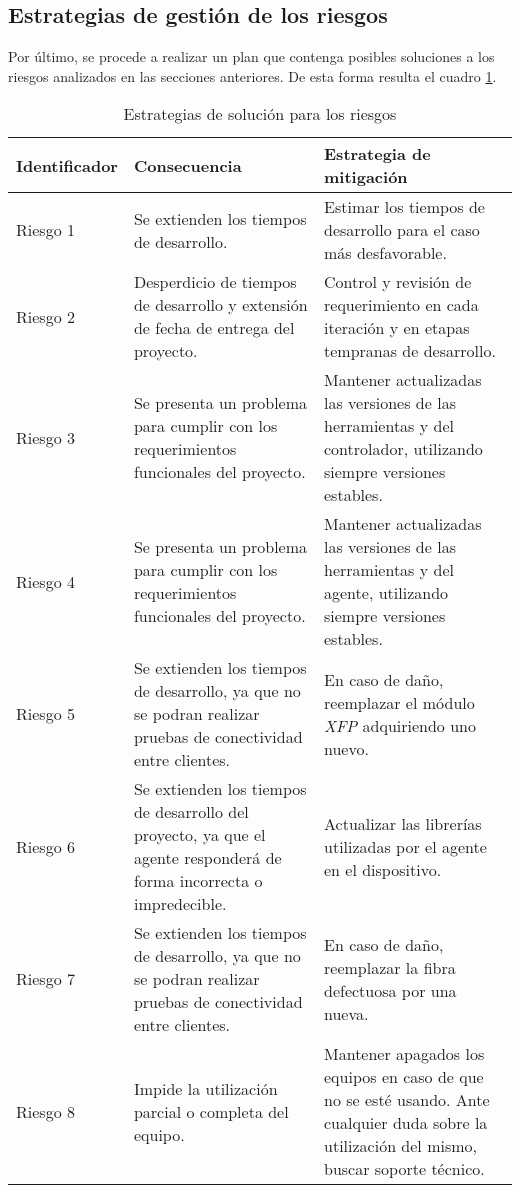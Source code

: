 \subsection{Estrategias de gestión de los riesgos}

Por último, se procede a realizar un plan que contenga posibles soluciones a los riesgos analizados en las secciones anteriores. De esta forma resulta el cuadro \ref{tab:riesgos_solucion}.

\begin{table}[H]
  \centering
  \begin{tabular}{ |m{2.2cm}|m{5.5cm}|m{5.5cm}|  }

\hline
\centering
\textbf{Identificador} & \textbf{Consecuencia} & \textbf{Estrategia de mitigación} \\
\hline
\centering
Riesgo 1 & Se extienden los tiempos de desarrollo. & Estimar los tiempos de desarrollo para el caso más desfavorable.  \\
\hline
\centering
Riesgo 2 & Desperdicio de tiempos de desarrollo y extensión de fecha de entrega del proyecto. & Control y revisión de requerimiento en cada iteración y en etapas tempranas de desarrollo.  \\
\hline
\centering
Riesgo 3 & Se presenta un problema para cumplir con los requerimientos funcionales del proyecto. & Mantener actualizadas las versiones de las herramientas y del controlador, utilizando siempre versiones estables. \\
\hline
\centering
Riesgo 4 & Se presenta un problema para cumplir con los requerimientos funcionales del proyecto. & Mantener actualizadas las versiones de las herramientas y del agente, utilizando siempre versiones estables.  \\
\hline

\centering
Riesgo 5 & Se extienden los tiempos de desarrollo, ya que no se podran realizar pruebas de conectividad entre clientes.  & En caso de daño, reemplazar el módulo \textit{XFP} adquiriendo uno nuevo.  \\
\hline

\centering
Riesgo 6 & Se extienden los tiempos de desarrollo del proyecto, ya que el agente responderá de forma incorrecta o impredecible. & Actualizar las librerías utilizadas por el agente en el dispositivo.  \\
\hline

\centering
Riesgo 7 & Se extienden los tiempos de desarrollo, ya que no se podran realizar pruebas de conectividad entre clientes. & En caso de daño, reemplazar la fibra defectuosa por una nueva.  \\
\hline

\centering
Riesgo 8 & Impide la utilización parcial o completa del equipo. & Mantener apagados los equipos en caso de que no se esté usando. Ante cualquier duda sobre la utilización del mismo, buscar soporte técnico.  \\
\hline

\end{tabular}
\caption{Estrategias de solución para los riesgos}
\label{tab:riesgos_solucion}
\end{table}
